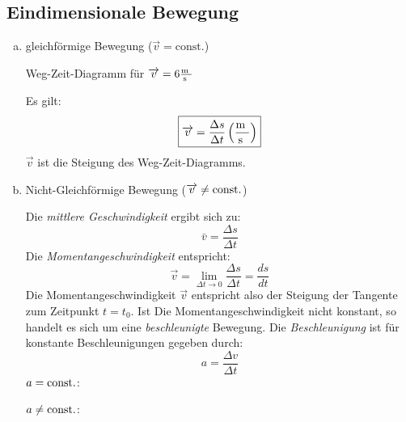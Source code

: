 \documentclass[a4paper,10pt]{scrartcl}
\begin{document}
\subsection{Eindimensionale Bewegung}
\begin{enumerate}[a)]
\item gleichförmige Bewegung ($\vec v=\text{const.}$)

\begin{seg}{Weg-Zeit-Diagramm für $\overrightarrow{v}=6\frac{\text{m }}{\text{s }}$}
\begin{figure}[h]
\end{figure}
\end{seg}
Es gilt:
\[
\boxed{\overrightarrow{v}=\frac{\Delta s}{\Delta t} \left (\frac{\text{m }}{\text{s }}\right )}
\]
$\vec v$ ist die Steigung des Weg-Zeit-Diagramms.
\item Nicht-Gleichförmige Bewegung ($\overrightarrow{v}\neq \text{const.}$)
\begin{figure}[h]
\end{figure}
Die \emph{mittlere Geschwindigkeit} ergibt sich zu:
\[\boxed{\bar v=\frac{\Delta s}{\Delta t}}\]
Die \emph{Momentangeschwindigkeit} entspricht:
\[\boxed{\vec v=\lim\limits_{\Delta t \rightarrow 0} \frac{\Delta s}{\Delta t}= \frac{ds}{dt}}\]
Die Momentangeschwindigkeit $\vec v$ entspricht also der Steigung der Tangente zum Zeitpunkt $t=t_0$. Ist Die Momentangeschwindigkeit nicht konstant, so handelt es sich um eine \emph{beschleunigte} Bewegung.  Die \emph{Beschleunigung} ist für konstante Beschleunigungen gegeben durch:
\[
\boxed{a=\frac{\Delta v}{\Delta t}}
\] 
$a=\text{const.}$:
\begin{figure}[h]
\end{figure}
$a\neq\text{const.}$:
\begin{figure}[h]
\end{figure}


\end{enumerate}
\end{document}
